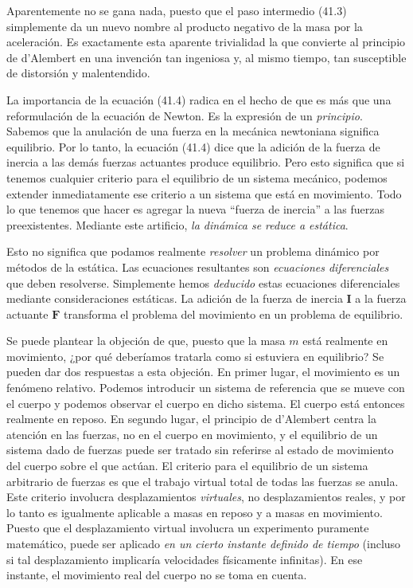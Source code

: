 \documentclass[12pt,a4paper]{book}
\begin{document}
Aparentemente no se gana nada, puesto que el paso intermedio (41.3) simplemente da un nuevo nombre al producto negativo de la masa por la aceleración. Es exactamente esta aparente trivialidad la que convierte al principio de d'Alembert en una invención tan ingeniosa y, al mismo tiempo, tan susceptible de distorsión y malentendido.

La importancia de la ecuación (41.4) radica en el hecho de que es más que una reformulación de la ecuación de Newton. Es la expresión de un \textit{principio}. Sabemos que la anulación de una fuerza en la mecánica newtoniana significa equilibrio. Por lo tanto, la ecuación (41.4) dice que la adición de la fuerza de inercia a las demás fuerzas actuantes produce equilibrio. Pero esto significa que si tenemos cualquier criterio para el equilibrio de un sistema mecánico, podemos extender inmediatamente ese criterio a un sistema que está en movimiento. Todo lo que tenemos que hacer es agregar la nueva ``fuerza de inercia'' a las fuerzas preexistentes. Mediante este artificio, \textit{la dinámica se reduce a estática}.

Esto no significa que podamos realmente \textit{resolver} un problema dinámico por métodos de la estática. Las ecuaciones resultantes son \textit{ecuaciones diferenciales} que deben resolverse. Simplemente hemos \textit{deducido} estas ecuaciones diferenciales mediante consideraciones estáticas. La adición de la fuerza de inercia $\mathbf{I}$ a la fuerza actuante $\mathbf{F}$ transforma el problema del movimiento en un problema de equilibrio.

Se puede plantear la objeción de que, puesto que la masa $m$ está realmente en movimiento, ¿por qué deberíamos tratarla como si estuviera en equilibrio? Se pueden dar dos respuestas a esta objeción. En primer lugar, el movimiento es un fenómeno relativo. Podemos introducir un sistema de referencia que se mueve con el cuerpo y podemos observar el cuerpo en dicho sistema. El cuerpo está entonces realmente en reposo. En segundo lugar, el principio de d'Alembert centra la atención en las fuerzas, no en el cuerpo en movimiento, y el equilibrio de un sistema dado de fuerzas puede ser tratado sin referirse al estado de movimiento del cuerpo sobre el que actúan. El criterio para el equilibrio de un sistema arbitrario de fuerzas es que el trabajo virtual total de todas las fuerzas se anula. Este criterio involucra desplazamientos \textit{virtuales}, no desplazamientos reales, y por lo tanto es igualmente aplicable a masas en reposo y a masas en movimiento. Puesto que el desplazamiento virtual involucra un experimento puramente matemático, puede ser aplicado \textit{en un cierto instante definido de tiempo} (incluso si tal desplazamiento implicaría velocidades físicamente infinitas). En ese instante, el movimiento real del cuerpo no se toma en cuenta.
\end{document}
